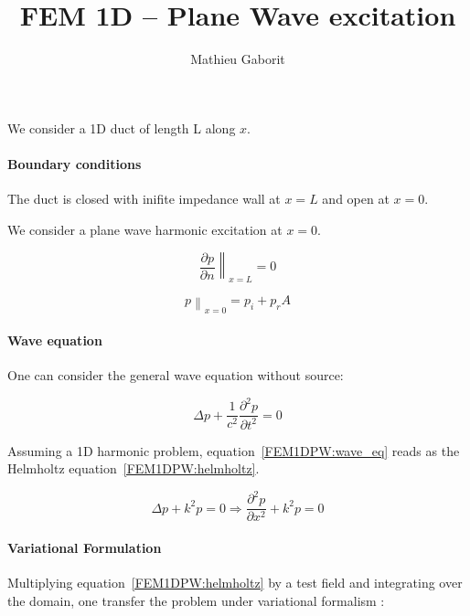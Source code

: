 \documentclass[a4paper, 11pt]{article}
\title{FEM 1D -- Plane Wave excitation}
\author{Mathieu Gaborit}
\begin{document}
	\maketitle

	We consider a 1D duct of length L along $x$.

	\paragraph{Boundary conditions}

	The duct is closed with inifite impedance wall at $x = L$ and open at $x = 0$.

	We consider a plane wave harmonic excitation at $x = 0$.

	\begin{equation}
		\left.\frac{\partial p}{\partial n}\right\|_{x=L} = 0 \label{FEM1DPW:BC_L}
	\end{equation}

	\begin{equation}
		\left.p\right\|_{x=0} = p_i + p_rA \label{FEM1DPW:BC_0}
	\end{equation}


	\paragraph{Wave equation}

	One can consider the general wave equation without source:

	\begin{equation}
		\Delta p + \frac{1}{c^2} \frac{\partial^2 p}{\partial t^2} = 0 \label{FEM1DPW:wave_eq}
	\end{equation}

	Assuming a 1D harmonic problem, equation~\eqref{FEM1DPW:wave_eq} reads as the Helmholtz equation~\eqref{FEM1DPW:helmholtz}.

	\begin{equation}
		\Delta p + k^2 p  = 0 \Rightarrow \frac{\partial^2p}{\partial x^2} + k^2p = 0\label{FEM1DPW:helmholtz}
	\end{equation}

	\paragraph{Variational Formulation}

	Multiplying equation~\eqref{FEM1DPW:helmholtz} by a test field and integrating over the domain, one transfer the
	problem under variational formalism :
\end{document}
